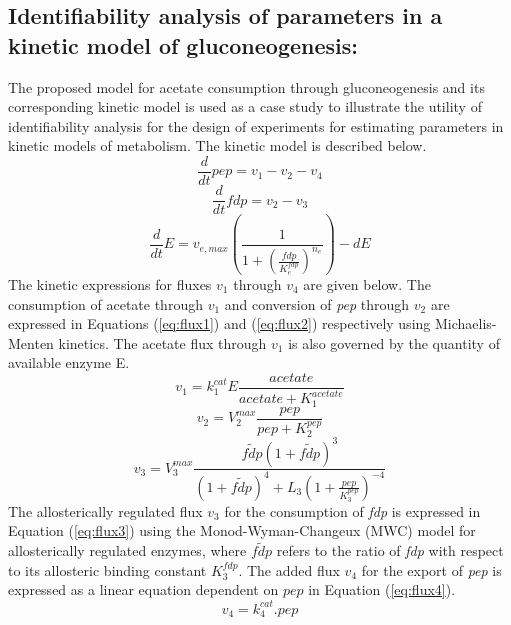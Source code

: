 \documentclass[10pt]{article}
\begin{document}
	\subsection{Identifiability analysis of parameters in a kinetic model of gluconeogenesis:}
	The proposed model for acetate consumption through gluconeogenesis and its corresponding kinetic model is used as a case study to illustrate the utility of identifiability analysis for the design of experiments for estimating parameters in kinetic models of metabolism. The kinetic model is described below.
	\begin{equation}\label{eq:ode1}
	\frac{d}{dt}pep=v_1-v_2-v_4
	\end{equation}
	\begin{equation}\label{eq:ode2}
	\frac{d}{dt}fdp=v_2-v_3
	\end{equation}
	\begin{equation}\label{eq:ode3}
	\frac{d}{dt}E=v_{e,max}\left(\frac{1}{1+\left(\frac{fdp}{K_{e}^{fdp}}\right)^{n_e}}\right) - d E
	\end{equation}
	The kinetic expressions for fluxes $v_1$ through $v_4$ are given below. The consumption of acetate through $v_1$ and conversion of \textit{pep} through $v_2$ are expressed in Equations (\ref{eq:flux1}) and (\ref{eq:flux2}) respectively using Michaelis-Menten kinetics. The acetate flux through $v_1$ is also governed by the quantity of available enzyme E. 
	\begin{equation}\label{eq:flux1}
	v_1 = k_{1}^{cat}E\frac{acetate}{acetate+K_{1}^{acetate}}
	\end{equation}	
	\begin{equation}\label{eq:flux2}
	v_2 = V_{2}^{max}\frac{pep}{pep+K_{2}^{pep}}
	\end{equation}
	\begin{equation}\label{eq:flux3}
	v_3 = V_{3}^{max}\frac{\tilde{fdp}\left(1+\tilde{fdp}\right)^3}{\left(1+\tilde{fdp}\right)^4+L_3\left(1+\frac{pep}{K_{3}^{pep}}\right)^{-4}}
	\end{equation}
	The allosterically regulated flux $v_3$ for the consumption of \textit{fdp} is expressed in Equation (\ref{eq:flux3}) using the Monod-Wyman-Changeux (MWC) model for allosterically regulated enzymes, where $\tilde{fdp}$ refers to the ratio of \textit{fdp} with respect to its allosteric binding constant $K_{3}^{fdp}$. The added flux $v_4$ for the export of \textit{pep} is expressed as a linear equation dependent on $pep$ in Equation (\ref{eq:flux4}).
	\begin{equation}\label{eq:flux4}
	v_4 = k_{4}^{cat}.pep
	\end{equation}
	
\end{document}
